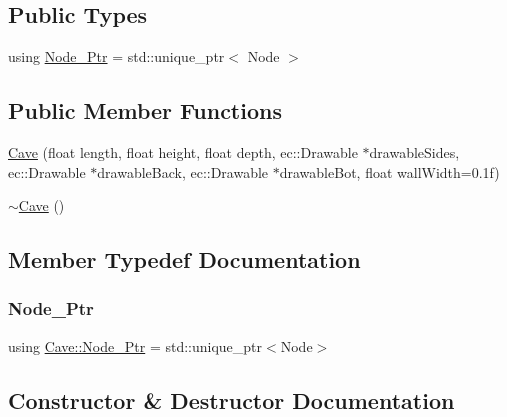 \subsection*{Public Types}
\begin{DoxyCompactItemize}
\item 
using \mbox{\hyperlink{class_cave_a0d833a1a6f48df766d5cf8d0a870cebd}{Node\+\_\+\+Ptr}} = std\+::unique\+\_\+ptr$<$ Node $>$
\end{DoxyCompactItemize}
\subsection*{Public Member Functions}
\begin{DoxyCompactItemize}
\item 
\mbox{\hyperlink{class_cave_a24b4301a1d49bbbc65e9256965ae563b}{Cave}} (float length, float height, float depth, ec\+::\+Drawable $\ast$drawable\+Sides, ec\+::\+Drawable $\ast$drawable\+Back, ec\+::\+Drawable $\ast$drawable\+Bot, float wall\+Width=0.\+1f)
\item 
\mbox{\hyperlink{class_cave_a0cba575d8166ade9308b75b5c05bd730}{$\sim$\+Cave}} ()
\end{DoxyCompactItemize}


\subsection{Member Typedef Documentation}
\mbox{\label{class_cave_a0d833a1a6f48df766d5cf8d0a870cebd}} 
\subsubsection{\texorpdfstring{Node\+\_\+\+Ptr}{Node\_Ptr}}
{\footnotesize\ttfamily using \mbox{\hyperlink{class_cave_a0d833a1a6f48df766d5cf8d0a870cebd}{Cave\+::\+Node\+\_\+\+Ptr}} =  std\+::unique\+\_\+ptr$<$Node$>$}



\subsection{Constructor \& Destructor Documentation}
\mbox{\label{class_cave_a24b4301a1d49bbbc65e9256965ae563b}} 
